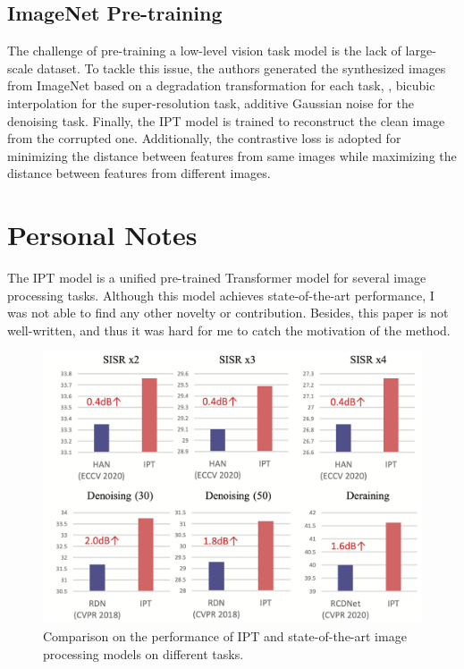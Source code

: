 \documentclass[10pt,twocolumn,letterpaper]{article}
\begin{document}
\subsection{ImageNet Pre-training}
The challenge of pre-training a low-level vision task model is the lack of large-scale dataset.
To tackle this issue, the authors generated the synthesized images from ImageNet based on a degradation transformation for each task, \eg, bicubic interpolation for the super-resolution task, additive Gaussian noise for the denoising task.
Finally, the IPT model is trained to reconstruct the clean image from the corrupted one.
Additionally, the contrastive loss is adopted for minimizing the distance between features from same images while maximizing the distance between features from different images.





\section{Personal Notes}

The IPT model is a unified pre-trained Transformer model for several image processing tasks.
Although this model achieves state-of-the-art performance, I was not able to find any other novelty or contribution.
Besides, this paper is not well-written, and thus it was hard for me to catch the motivation of the method.

\begin{figure}[t]
    \includegraphics[width=\linewidth]{assets/comparison.png}
    \caption{\label{fig:comparison}Comparison on the performance of IPT and state-of-the-art image processing models on different tasks.}
\end{figure}
\end{document}
